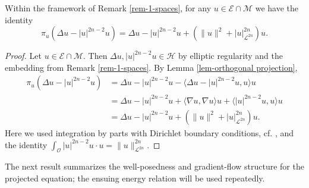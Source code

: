 \documentclass[reqno]{amsart}
\begin{document}
\begin{corollary}
\label{cor-projection}
Within the framework of Remark \ref{rem-1-spaces}, for any
$u \in \mathcal{E} \cap \mathcal{M}$ we have the identity
\begin{equation}
\pi_{u} \left( \Delta u - |u|^{2n-2} u \right)
= \Delta u - |u|^{2n-2} u + \left( \|u\|^{2} + |u|_{\mathcal{L}^{2n}}^{2n} \right) u.
\label{1-1.2}
\end{equation}
\end{corollary}

\begin{proof}
Let $u \in \mathcal{E} \cap \mathcal{M}$. Then $\Delta u, |u|^{2n-2}u \in \mathcal{H}$
by elliptic regularity and the embedding from Remark \ref{rem-1-spaces}.
By Lemma \ref{lem-orthogonal projection},
\begin{equation} \label{1-1.3}
\begin{aligned}
\pi_{u} \left( \Delta u - |u|^{2n-2} u \right)
&= \Delta u - |u|^{2n-2} u - \langle \Delta u - |u|^{2n-2} u, u \rangle u  \\
&= \Delta u - |u|^{2n-2} u + \langle \nabla u, \nabla u \rangle u
 + \langle |u|^{2n-2} u, u \rangle u  \\
&= \Delta u - |u|^{2n-2} u + \left( \|u\|^{2} + |u|_{\mathcal{L}^{2n}}^{2n} \right) u.
\end{aligned}
\end{equation}
Here we used integration by parts with Dirichlet boundary conditions,
cf. \cite[Corollary 8.10, p.~82]{Haim}, and the identity
$\int_{\mathcal{O}} |u|^{2n-2} u \cdot u = \|u\|_{\mathcal{L}^{2n}}^{2n}$.
\end{proof}

The next result summarizes the well-posedness and gradient-flow structure for the
projected equation; the ensuing energy relation will be used repeatedly.
\end{document}
